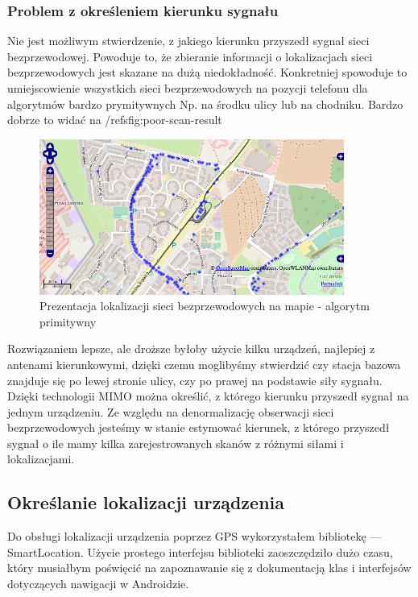 \subsubsection{Problem z określeniem kierunku sygnału}
Nie jest możliwym stwierdzenie, z jakiego kierunku przyszedł sygnał sieci bezprzewodowej. Powoduje to, że zbieranie informacji o lokalizacjach sieci bezprzewodowych jest skazane na dużą niedokładność. Konkretniej spowoduje to umiejscowienie wszystkich sieci bezprzewodowych na pozycji telefonu dla algorytmów bardzo prymitywnych Np. na środku ulicy lub na chodniku. Bardzo dobrze to widać na /refs{fig:poor-scan-result}

\begin{figure}[h!]
  \centering
    \includegraphics[width=10cm]{images/poor-scan-result}
  \caption{Prezentacja lokalizacji sieci bezprzewodowych na mapie - algorytm primitywny}
  \label{fig:poor-scan-result}
\end{figure}

Rozwiązaniem lepsze, ale droższe byłoby użycie kilku urządzeń, najlepiej z antenami kierunkowymi, dzięki czemu moglibyśmy stwierdzić czy stacja bazowa znajduje się po lewej stronie ulicy, czy po prawej na podstawie siły sygnału.
Dzięki technologii MIMO można określić, z którego kierunku przyszedł sygnał na jednym urządzeniu. Ze względu na denormalizację obserwacji sieci bezprzewodowych jesteśmy w stanie estymować kierunek, z którego przyszedł sygnał o ile mamy kilka zarejestrowanych skanów z różnymi siłami i lokalizacjami.


\subsection{Określanie lokalizacji urządzenia}
Do obsługi lokalizacji urządzenia poprzez GPS wykorzystałem bibliotekę — SmartLocation. Użycie prostego interfejsu biblioteki zaoszczędziło dużo czasu, który musiałbym poświęcić na zapoznawanie się z dokumentacją klas i interfejsów dotyczących nawigacji w Androidzie.

